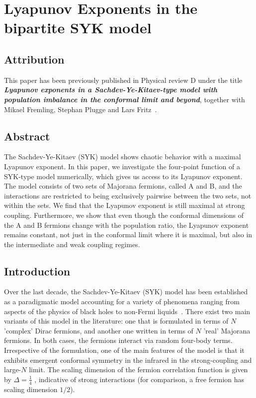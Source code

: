 \chapter{Lyapunov Exponents in the bipartite SYK model}
\label{ch:LyapbSYK}

\section*{Attribution}
This paper has been previously published in Physical review D under the title \textbf{\textit{Lyapunov exponents in a Sachdev-Ye-Kitaev-type model with population imbalance in the conformal limit and beyond}}, together with Mikael Fremling, Stephan Plugge and Lars Fritz~\cite{shankar2023lyapunov}.

\section*{Abstract}
The Sachdev-Ye-Kitaev (SYK) model shows chaotic behavior with a maximal Lyapunov exponent. In this paper, we investigate the four-point function of a SYK-type model numerically, which gives us access to its Lyapunov exponent. The model consists of two sets of Majorana fermions, called A and B, and the interactions are restricted to being exclusively pairwise between the two sets, not within the sets. We find that the Lyapunov exponent is still maximal at strong coupling. Furthermore, we show that even though the conformal dimensions of the A and B fermions change with the population ratio, the Lyapunov exponent remains constant, not just in the conformal limit where it is maximal, but also in the intermediate and weak coupling regimes.

\section{Introduction}
Over the last decade, the Sachdev-Ye-Kitaev (SYK) model has been established as a paradigmatic model accounting for a variety of phenomena ranging from aspects of the physics of black holes to non-Fermi liquids~\cite{Chowdhury-RMP2022,Rosenhaus2019-review,Franz2018-review,patel_quantum_2017,tikhanovskaya2022maximal}.
There exist two main variants of this model in the literature: one that is formulated in terms of $N$ 'complex' Dirac fermions,
and another one written in terms of $N$ 'real' Majorana fermions.
In both cases, the fermions interact via random four-body terms.
Irrespective of the formulation, one of the main features of the model is that it exhibits emergent conformal symmetry in the infrared in the strong-coupling and large-$N$ limit.
The scaling dimension of the fermion correlation function is given by $\Delta = \frac{1}{4}$ \cite{maldacena_comments_2016,polchinski_spectrum_2016},
indicative of strong interactions (for comparison, a free fermion has scaling dimension $1/2$). 

